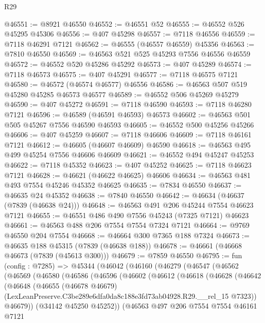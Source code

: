 \begin{lexlean}{R29}
\begin{coremodule}
@46551 := @8921 @46550
@46552 := @46551 @52
@46555 := @46552 @526 @45295 @45306
@46556 := @407 @45298
@46557 := @7118 @46556
@46559 := @7118 @46291 @7121
@46562 := @46555 (@46557 @46559) @45356
@46563 := @7810 @46550
@46569 := @46563 @521 @525 @45293 @7556 @46556 @46559
@46572 := @46552 @520 @45286 @45292
@46573 := @407 @45289
@46574 := @7118 @46573
@46575 := @407 @45291
@46577 := @7118 @46575 @7121
@46580 := @46572 (@46574 @46577) @46556
@46586 := @46563 @507 @519 @45280 @45285 @46573 @46577
@46589 := @46552 @506 @45269 @45279
@46590 := @407 @45272
@46591 := @7118 @46590
@46593 := @7118 @46280 @7121
@46596 := @46589 (@46591 @46593) @46573
@46602 := @46563 @501 @505 @45267 @7556 @46590 @46593
@46605 := @46552 @500 @45256 @45266
@46606 := @407 @45259
@46607 := @7118 @46606
@46609 := @7118 @46161 @7121
@46612 := @46605 (@46607 @46609) @46590
@46618 := @46563 @495 @499 @45254 @7556 @46606 @46609
@46621 := @46552 @494 @45247 @45253
@46622 := @7118 @45352
@46623 := @407 @45252
@46625 := @7118 @46623 @7121
@46628 := @46621 (@46622 @46625) @46606
@46634 := @46563 @481 @493 @7554 @45246 @45352 @46625
@46635 := @7834 @46550
@46637 := @46635 @24 @45352
@46638 := @7840 @46550
@46642 := @46634 (@46637 (@7839 (@46638 @24)))
@46648 := @46563 @491 @206 @45244 @7554 @46623 @7121
@46655 := @46551 @486 @490 @7556 @45243 (@7325 @7121) @46623
@46661 := @46563 @488 @206 @7554 @7554 @7324 @7121
@46664 := @9769 @46550 @204 @7554
@46668 := @46664 @300 @7365 @188 @7324
@46673 := @46635 @188 @45315 (@7839 (@46638 @188))
@46678 := @46661 (@46668 @46673 (@7839 (@45613 @300)))
@46679 := @7859 @46550
@46795 := fun (config : @7285) =>
  @45344
    (@46042
      (@46160
        (@46279
          (@46547
            (@46562
              (@46569
                (@46580
                  (@46586
                    (@46596
                      (@46602
                        (@46612
                          (@46618
                            (@46628
                              (@46642
                                (@46648
                                  (@46655
                                    (@46678 @46679)
                                    (LexLeanPreserve.C3be289e6dfa0da8c188e3fd73ab04928.R29.__rel_15
                                      @7323))
                                  @46679))
                              (@34142 @45250 @45252))
                            (@46563
                              @497
                              @206
                              @7554
                              @7554
                              @46161
                              @7121

\end{coremodule}
\end{lexlean}
